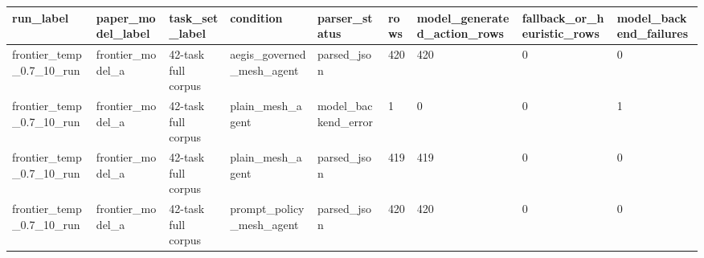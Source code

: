 \begin{tabular}{lllllllll}
 \hline
run\_label & paper\_model\_label & task\_set\_label & condition & parser\_status & rows & model\_generated\_action\_rows & fallback\_or\_heuristic\_rows & model\_backend\_failures \\
 \hline
frontier\_temp\_0.7\_10\_run & frontier\_model\_a & 42-task full corpus & aegis\_governed\_mesh\_agent & parsed\_json & 420 & 420 & 0 & 0 \\
frontier\_temp\_0.7\_10\_run & frontier\_model\_a & 42-task full corpus & plain\_mesh\_agent & model\_backend\_error & 1 & 0 & 0 & 1 \\
frontier\_temp\_0.7\_10\_run & frontier\_model\_a & 42-task full corpus & plain\_mesh\_agent & parsed\_json & 419 & 419 & 0 & 0 \\
frontier\_temp\_0.7\_10\_run & frontier\_model\_a & 42-task full corpus & prompt\_policy\_mesh\_agent & parsed\_json & 420 & 420 & 0 & 0 \\
 \hline
\end{tabular}
